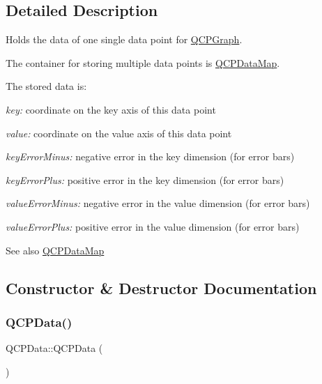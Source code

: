 \subsection{Detailed Description}
Holds the data of one single data point for \mbox{\hyperlink{class_q_c_p_graph}{Q\+C\+P\+Graph}}. 

The container for storing multiple data points is \mbox{\hyperlink{qcustomplot_8h_a84a9c4a4c2216ccfdcb5f3067cda76e3}{Q\+C\+P\+Data\+Map}}.

The stored data is\+: \begin{DoxyItemize}
\item {\itshape key\+:} coordinate on the key axis of this data point \item {\itshape value\+:} coordinate on the value axis of this data point \item {\itshape key\+Error\+Minus\+:} negative error in the key dimension (for error bars) \item {\itshape key\+Error\+Plus\+:} positive error in the key dimension (for error bars) \item {\itshape value\+Error\+Minus\+:} negative error in the value dimension (for error bars) \item {\itshape value\+Error\+Plus\+:} positive error in the value dimension (for error bars)\end{DoxyItemize}
\begin{DoxySeeAlso}{See also}
\mbox{\hyperlink{qcustomplot_8h_a84a9c4a4c2216ccfdcb5f3067cda76e3}{Q\+C\+P\+Data\+Map}} 
\end{DoxySeeAlso}


\subsection{Constructor \& Destructor Documentation}
\mbox{\label{class_q_c_p_data_a1f06d624e36ba0ed72ac36d42aa5c7ee}} 
\subsubsection{\texorpdfstring{Q\+C\+P\+Data()}{QCPData()}\hspace{0.1cm}{\footnotesize\ttfamily [1/2]}}
{\footnotesize\ttfamily Q\+C\+P\+Data\+::\+Q\+C\+P\+Data (\begin{DoxyParamCaption}{ }\end{DoxyParamCaption})}

